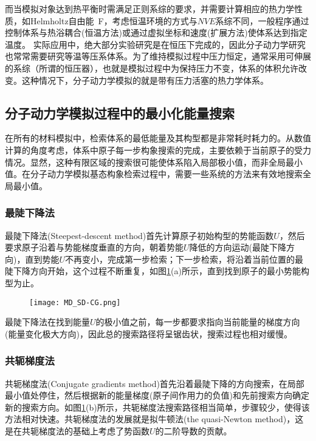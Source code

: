而当模拟对象达到热平衡时需满足正则系综的要求，并需要计算相应的热力学性质，如\textrm{Helmholtz}自由能~\textrm{F}，考虑恒温环境的方式与$NVE$系综不同，一般程序通过控制体系与热浴耦合(恒温方法)或通过虚拟坐标和速度(扩展方法)使体系达到指定温度。
实际应用中，绝大部分实验研究是在恒压下完成的，因此分子动力学研究也常常需要研究等温等压系体系。为了维持模拟过程中压力恒定，通常采用可伸展的系综（所谓的恒压器），也就是模拟过程中为保持压力不变，体系的体积允许改变。这种情况下，分子动力学模拟的就是带有压力活塞的热力学体系。
\subsection{分子动力学模拟过程中的最小化能量搜索}
在所有的材料模拟中，检索体系的最低能量及其构型都是非常耗时耗力的。从数值计算的角度考虑，体系中原子每一步构象搜索的完成，主要依赖于当前原子的受力情况。显然，这种有限区域的搜索很可能使体系陷入局部极小值，而非全局最小值。在分子动力学模拟基态构象检索过程中，需要一些系统的方法来有效地搜索全局最小值。
\subsubsection{最陡下降法}
最陡下降法\textrm{(Steepest-descent method)}首先计算原子初始构型的势能函数$U$，然后要求原子沿着与势能梯度垂直的方向，朝着势能$U$降低的方向运动(最陡下降方向)，直到势能$U$不再变小，完成第一步检索；下一步检索，将沿着当前位置的最陡下降方向开始，这个过程不断重复，如图\ref{MD_SD-CG}\textrm{(a)}所示，直到找到原子的最小势能构型为止。
\begin{figure}[h!]
\centering
\vspace*{-0.1in}
\texttt{[image: MD\_SD-CG.png]}
\caption{\fontsize{7.2pt}{4.2pt}}%
\label{MD_SD-CG}
\end{figure}
最陡下降法在找到能量$U$的极小值之前，每一步都要求指向当前能量的梯度方向(能量变化极大方向)，因此总的搜索路径将呈锯齿状，搜索过程也相对缓慢。
\subsubsection{共轭梯度法}
共轭梯度法\textrm{(Conjugate gradients method)}首先沿着最陡下降的方向搜索，在局部最小值处停住，然后根据新的能量梯度(原子间作用力的负值)和先前搜索方向确定新的搜索方向。如图\ref{MD_SD-CG}(b)所示，共轭梯度法搜索路径相当简单，步骤较少，使得该方法相对快速。共轭梯度法的发展就是拟牛顿法\textrm{(the quasi-Newton method)}，这是在共轭梯度法的基础上考虑了势函数$U$的二阶导数的贡献。


